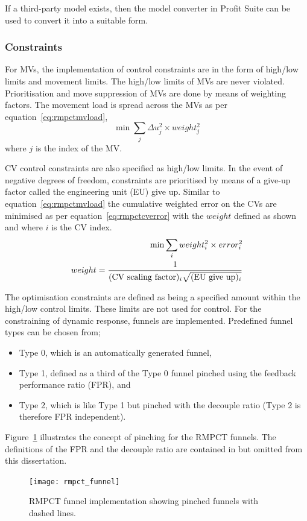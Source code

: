If a third-party model exists, then the model converter in Profit Suite can be used to convert it into a suitable form.
  
\subsubsection{Constraints}
For MVs, the implementation of control constraints are in the form of high/low limits and movement limits.
The high/low limits of MVs are never violated.
Prioritisation and move suppression of MVs are done by means of weighting factors.
The movement load is spread across the MVs as per equation~\ref{eq:rmpctmvload},
\begin{equation}
  \label{eq:rmpctmvload}
  \min \sum_j \Delta u_j^2 \times weight_j^2
\end{equation}
where $j$ is the index of the MV.

CV control constraints are also specified as high/low limits.
In the event of negative degrees of freedom, constraints are prioritised by means of a give-up factor called the engineering unit (EU) give up.
Similar to equation~\ref{eq:rmpctmvload} the cumulative weighted error on the CVs are minimised as per equation~\ref{eq:rmpctcverror} with the $weight$ defined as shown and where $i$ is the CV index.
\begin{align}
  \label{eq:rmpctcverror}
  \min \sum_i weight_i^2 \times error_i^2 \\
  weight = \frac{1}{(\text{CV scaling factor})_i\sqrt{(\text{EU give up})_i}} \notag
\end{align}

The optimisation constraints are defined as being a specified amount within the high/low control limits.
These limits are not used for control.
For the constraining of dynamic response, funnels are implemented.
Predefined funnel types can be chosen from;
\begin{itemize}
\item Type 0, which is an automatically generated funnel,
\item Type 1, defined as a third of the Type 0 funnel pinched using the feedback performance ratio (FPR), and
\item Type 2, which is like Type 1 but pinched with the decouple ratio (Type 2 is therefore FPR independent).
\end{itemize}
Figure~\ref{fig:rmpctfunnel} illustrates the concept of pinching for the RMPCT funnels.
The definitions of the FPR and the decouple ratio are contained in \citet{honeywell1} but omitted from this dissertation.
\begin{figure}[htbp]
  \centering
  \texttt{[image: rmpct\_funnel]}
  \caption[RMPCT funnel implementation]{RMPCT funnel implementation showing pinched funnels with dashed lines.}
  \label{fig:rmpctfunnel}
\end{figure}

